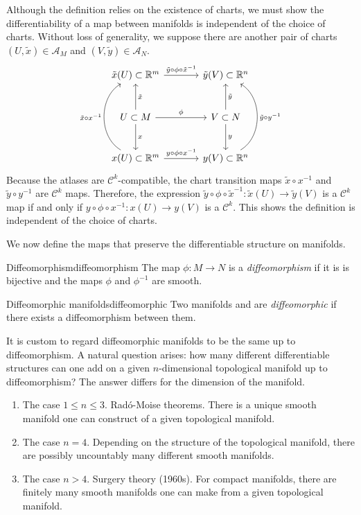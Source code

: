 Although the definition relies on the existence of charts, we must show the differentiability of a map between manifolds is independent of the choice of charts. Without loss of generality, we suppose there are another pair of charts \((U, \tilde{x})\in\mathscr{A}_M\) and \((V, \tilde{y})\in\mathscr{A}_N\).
\begin{equation*}
    \begin{tikzcd}[column sep = large, row sep = large]
        \tilde{x}(U) \subset \mathbb{R}^m \arrow{r}{\tilde{y}\circ \phi \circ \tilde{x}^{-1}} & \tilde{y}(V) \subset \mathbb{R}^n\\
        U \subset M \arrow{d}{x} \arrow[swap]{u}{\tilde{x}} \arrow{r}{\phi} & V \subset N \arrow{d}{y} \arrow[swap]{u}{\tilde{y}}\\
        x(U) \subset \mathbb{R}^m \arrow{r}{y\circ \phi \circ x^{-1}} \arrow[bend left=60]{uu}{\tilde{x} \circ x^{-1}} & y(V) \subset \mathbb{R}^n \arrow[bend right=60, swap]{uu}{\tilde{y}\circ y^{-1}}
    \end{tikzcd}
\end{equation*}
Because the atlases are \(\mathcal{C}^k\)-compatible, the chart transition maps \(\tilde{x}\circ x^{-1}\) and \(\tilde{y} \circ y^{-1}\) are \(\mathcal{C}^k\) maps. Therefore, the expression \(\tilde{y}\circ \phi \circ\tilde{x}^{-1} : \tilde{x}(U) \to \tilde{y}(V)\) is a \(\mathcal{C}^k\) map if and only if \(y\circ \phi\circ x^{-1} : x(U) \to y(V)\) is a \(\mathcal{C}^k\). This shows the definition is independent of the choice of charts.

We now define the maps that preserve the differentiable structure on manifolds.
\begin{definition}{Diffeomorphism}{diffeomorphism}
    The map \(\phi : M \to N\) is a \emph{diffeomorphism} if it is is bijective and the maps \(\phi\) and \(\phi^{-1}\) are smooth.
\end{definition}

\begin{definition}{Diffeomorphic manifolds}{diffeomorphic}
    Two manifolds  and  are \emph{diffeomorphic} if there exists a diffeomorphism between them.
\end{definition}

It is custom to regard diffeomorphic manifolds to be the same up to diffeomorphism. A natural question arises: how many different differentiable structures can one add on a given \(n\)-dimensional topological manifold up to diffeomorphism? The answer differs for the dimension of the manifold.
\begin{enumerate}[label=(\alph*)]
    \item The case \(1 \leq n \leq 3\). Radó-Moise theorems. There is a unique smooth manifold one can construct of a given topological manifold.
    \item The case \(n = 4\). Depending on the structure of the topological manifold, there are possibly uncountably many different smooth manifolds.
    \item The case \(n > 4\). Surgery theory (1960s). For compact manifolds, there are finitely many smooth manifolds one can make from a given topological manifold.
\end{enumerate}
